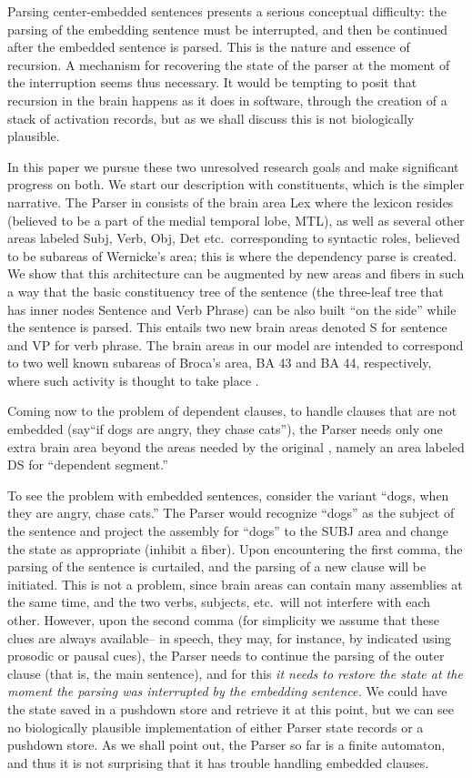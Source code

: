 \documentclass[11pt]{article}
\begin{document}
Parsing center-embedded sentences presents a serious conceptual difficulty: the parsing of the embedding sentence must be interrupted, and then be continued after the embedded sentence is parsed.  This is the nature and essence of recursion.  A mechanism for recovering the state of the parser at the moment of the interruption seems thus necessary.  It would be tempting to posit that recursion in the brain happens as it does in software, through the creation of a stack of activation records, but as we shall discuss this is not biologically plausible.

In this paper we pursue these two unresolved research goals and make significant progress on both. We start our description with constituents, which is the simpler narrative. The Parser in \citet{Parser} consists of the brain area {\sc Lex} where the lexicon resides (believed to be a part of the medial temporal lobe, MTL), as well as several other areas labeled {\sc Subj}, {\sc Verb}, {\sc Obj}, {\sc Det} etc.~corresponding to syntactic roles, believed to be subareas of Wernicke's area; this is where the dependency parse is created.  We show that this architecture can be augmented by new areas and fibers in such a way that the basic constituency tree of the sentence (the three-leaf tree that has inner nodes Sentence and Verb Phrase) can be also built ``on the side'' while the sentence is parsed.  This entails two new brain areas denoted S for sentence and VP for verb phrase. The brain areas in our model are intended to correspond to two well known subareas of Broca's area, BA 43 and BA 44, respectively, where such activity is thought to take place \cite{Friederici}. 

Coming now to the problem of dependent clauses, to handle clauses that are not embedded (say``if dogs are angry, they chase cats''), the  Parser needs only one extra brain area beyond the areas needed by the original \cite{Parser}, namely an area labeled {\sc DS} for ``dependent segment.'' 

To see the problem with embedded sentences, consider the variant ``dogs, when they are angry, chase cats.''  The Parser would recognize ``dogs'' as the subject of the sentence and project the assembly for ``dogs'' to the SUBJ area and change the state as appropriate (inhibit a fiber).  Upon encountering the first comma, the parsing of the sentence is curtailed, and the parsing of a new clause will be initiated. This is not a problem, since brain areas can contain many assemblies at the same time, and the two verbs, subjects, etc.~will not interfere with each other. However, upon the second comma (for simplicity we assume that these clues are always available-- in speech, they may, for instance, by indicated using prosodic or pausal cues), the Parser needs to continue the parsing of the outer clause (that is, the main sentence), and for this {\em it needs to restore the state at the moment the parsing was interrupted by the embedding sentence.}  We could have the state saved in a pushdown store and retrieve it at this point, but we can see no biologically plausible implementation of either Parser state records or a pushdown store.  As we shall point out, the Parser so far is a finite automaton, and thus it is not surprising that it has trouble handling embedded clauses.  
\end{document}
